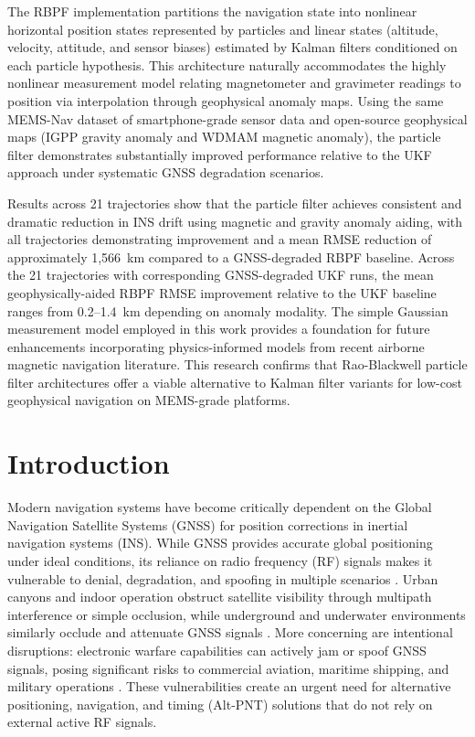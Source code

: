 \documentclass[letterpaper,times]{IONconf}
\begin{document}
The RBPF implementation partitions the navigation state into nonlinear horizontal position states represented by particles and linear states (altitude, velocity, attitude, and sensor biases) estimated by Kalman filters conditioned on each particle hypothesis. This architecture naturally accommodates the highly nonlinear measurement model relating magnetometer and gravimeter readings to position via interpolation through geophysical anomaly maps. Using the same MEMS-Nav dataset of smartphone-grade sensor data and open-source geophysical maps (IGPP gravity anomaly and WDMAM magnetic anomaly), the particle filter demonstrates substantially improved performance relative to the UKF approach under systematic GNSS degradation scenarios.

Results across 21 trajectories show that the particle filter achieves consistent and dramatic reduction in INS drift using magnetic and gravity anomaly aiding, with all trajectories demonstrating improvement and a mean RMSE reduction of approximately 1,566~km compared to a GNSS-degraded RBPF baseline. Across the 21 trajectories with corresponding GNSS-degraded UKF runs, the mean geophysically-aided RBPF RMSE improvement relative to the UKF baseline ranges from 0.2--1.4~km depending on anomaly modality. The simple Gaussian measurement model employed in this work provides a foundation for future enhancements incorporating physics-informed models from recent airborne magnetic navigation literature. This research confirms that Rao-Blackwell particle filter architectures offer a viable alternative to Kalman filter variants for low-cost geophysical navigation on MEMS-grade platforms.

\section{Introduction}

Modern navigation systems have become critically dependent on the Global Navigation Satellite Systems (GNSS) for position corrections in inertial navigation systems (INS). While GNSS provides accurate global positioning under ideal conditions, its reliance on radio frequency (RF) signals makes it vulnerable to denial, degradation, and spoofing in multiple scenarios \citep{humphreys2008,gnss-vulnerabilities,divis2013gps}. Urban canyons and indoor operation obstruct satellite visibility through multipath interference or simple occlusion, while underground and underwater environments similarly occlude and attenuate GNSS signals \citep{underwater_review,underwater_survey,indoor_survey}. More concerning are intentional disruptions: electronic warfare capabilities can actively jam or spoof GNSS signals, posing significant risks to commercial aviation, maritime shipping, and military operations \citep{9112619,gnss_rf_interference}. These vulnerabilities create an urgent need for alternative positioning, navigation, and timing (Alt-PNT) solutions that do not rely on external active RF signals.
\end{document}
